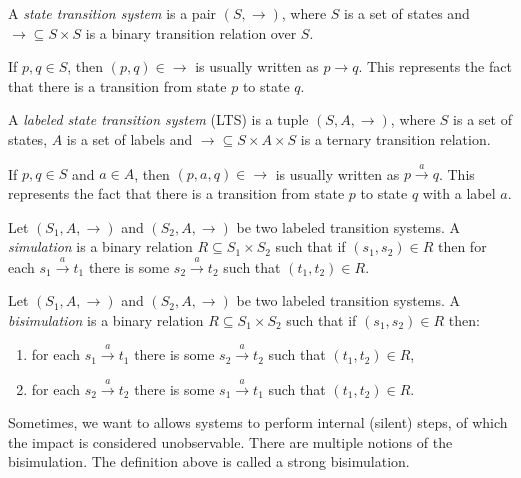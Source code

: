 \begin{definition}
  A {\em state transition system} is a pair $(S, \rightarrow)$, where $S$ is a set of states and $\rightarrow\subseteq S\times S$ is a binary transition relation over $S$.
\end{definition}
  If $p,q\in S$, then $(p,q)\in \rightarrow$ is usually written as $p\rightarrow q$. This represents the fact that there is a transition from state $p$ to state $q$.

\begin{definition}
  A {\em labeled state transition system} (LTS) is a tuple $(S, A, \rightarrow)$, where $S$ is a set of states, $A$ is a set of labels and $\rightarrow\subseteq S\times A\times S$ is a ternary transition relation.
\end{definition}

If $p,q\in S$ and $a\in A$, then $(p,a,q)\in \rightarrow$ is usually written as $p\xrightarrow{a} q$. This represents the fact that there is a transition from state $p$ to state $q$ with a label $a$.

\begin{definition}
  Let $(S_1, A, \rightarrow)$ and $(S_2, A, \rightarrow)$ be two labeled transition systems.
  A {\em simulation} is a binary relation $R\subseteq S_1\times S_2$ such that if $(s_1,s_2)\in R$ then for each $s_1\xrightarrow{a} t_1$ there is some $s_2\xrightarrow{a} t_2$ such that $(t_1, t_2)\in R$.
\end{definition}

\begin{definition}
  Let $(S_1, A, \rightarrow)$ and $(S_2, A, \rightarrow)$ be two labeled transition systems.
  A {\em bisimulation} is a binary relation $R\subseteq S_1\times S_2$ such that if $(s_1,s_2)\in R$ then:
  \begin{enumerate}
    \item for each $s_1\xrightarrow{a} t_1$ there is some $s_2\xrightarrow{a} t_2$ such that $(t_1, t_2)\in R$,
    \item for each $s_2\xrightarrow{a} t_2$ there is some $s_1\xrightarrow{a} t_1$ such that $(t_1, t_2)\in R$.
  \end{enumerate}
\end{definition}

Sometimes, we want to allows systems to perform internal (silent) steps, of which the impact is considered unobservable. There are multiple notions of the bisimulation. The definition above is called a strong bisimulation.

